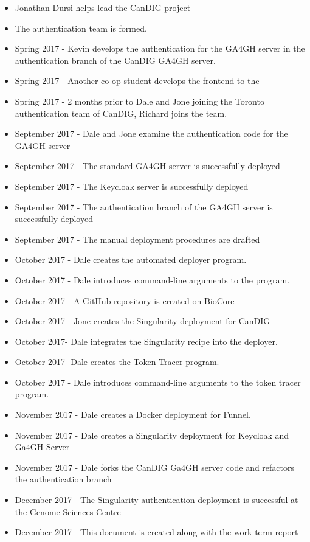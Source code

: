 \documentclass{article}
\begin{document}
\begin{itemize}
\item Jonathan Dursi helps lead the CanDIG project
\item The authentication team is formed.
\item Spring 2017 - Kevin develops the authentication for the GA4GH server
in the authentication branch of the CanDIG GA4GH server.
\item Spring 2017 - Another co-op student develops the frontend to the 
\item Spring 2017 - 2 months prior to Dale and Jone joining the Toronto
authentication team of CanDIG, Richard joins the team.
\item September 2017 - Dale and Jone examine the authentication code for the GA4GH server
\item September 2017 - The standard GA4GH server is successfully deployed
\item September 2017 - The Keycloak server is successfully deployed
\item September 2017 - The authentication branch of the GA4GH server is successfully deployed
\item September 2017 - The manual deployment procedures are drafted
\item October 2017 - Dale creates the automated deployer program.
\item October 2017 - Dale introduces command-line arguments to the program.
\item October 2017 - A GitHub repository is created on BioCore
\item October 2017 - Jone creates the Singularity deployment for CanDIG
\item October 2017- Dale integrates the Singularity recipe into the deployer.
\item October 2017- Dale creates the Token Tracer program.
\item October 2017 - Dale introduces command-line arguments to the token tracer program.
\item November 2017 - Dale creates a Docker deployment for Funnel.
\item November 2017 - Dale creates a Singularity deployment for Keycloak and Ga4GH Server
\item November 2017 - Dale forks the CanDIG Ga4GH server code and refactors the authentication branch
\item December 2017 - The Singularity authentication deployment is successful at the Genome Sciences Centre
\item December 2017 - This document is created along with the work-term report  
\end{itemize}
\end{document}
